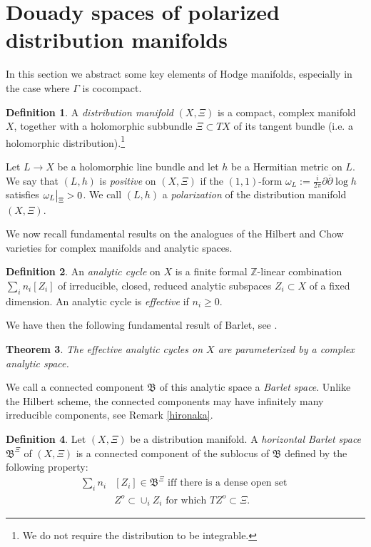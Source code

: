 \documentclass[10pt,letterpaper,english,reqno]{amsart}
\numberwithin{equation}{subsection}
\newcommand\Z{{\mathbb Z}}
\newtheorem{theorem}{Theorem}[section]
\theoremstyle{definition}
\newtheorem{definition}[theorem]{Definition}
\begin{document}
\section{Douady spaces of polarized distribution manifolds}

In this section we abstract some key elements of Hodge
manifolds, especially in the case where $\Gamma$ is cocompact.

\begin{definition} A {\it distribution manifold} $(X,\Xi)$ is a compact,
complex manifold $X$, together with a holomorphic subbundle
$\Xi\subset TX$ of its tangent bundle (i.e. a holomorphic 
distribution).\footnote{We do not require the distribution to be integrable.}

Let $L\to X$ be a holomorphic line bundle and let $h$ be a Hermitian 
metric on $L$. We say that $(L,h)$ is {\it positive} on $(X,\Xi)$ if 
the $(1,1)$-form 
$\omega_L:=\frac{i}{2\pi}\partial\overline{\partial}\log h$ 
satisfies $\omega_L\big{|}_{\Xi}>0$. We call $(L,h)$ a {\it polarization}
of the distribution manifold $(X,\Xi)$. \end{definition}

We now recall fundamental results on the analogues of
the Hilbert and Chow varieties for complex manifolds and 
analytic spaces.

\begin{definition} An {\it analytic cycle} on $X$ is a finite
formal $\Z$-linear combination $\sum_i n_i[Z_i]$ of 
irreducible, closed, reduced analytic subspaces
$Z_i\subset X$ of a fixed dimension. 
An analytic cycle is {\it effective} if $n_i\geq 0$. \end{definition}

We have then the following fundamental result of Barlet, 
see \cite{barlet}.

\begin{theorem}\label{barlet} The effective analytic 
cycles on $X$ are parameterized by a complex
analytic space.
\end{theorem}

We call a connected component $\mathfrak{B}$ 
of this analytic space a {\it Barlet space}.
Unlike the Hilbert
scheme, the connected components
may have infinitely many irreducible
components, see Remark
\ref{hironaka}.

\begin{definition} Let $(X,\Xi)$ be a distribution manifold. A {\it horizontal Barlet space} $\mathfrak{B}^{\Xi}$ of $(X,\Xi)$ is a connected component
of the sublocus of $\mathfrak{B}$ defined by the following property: \begin{align*} \textstyle \sum_i n_i&[Z_i]\in
\mathfrak{B}^{\Xi}\textrm{ iff there is a dense open set }  \\ & Z^o\subset \cup_iZ_i\textrm{ for which }TZ^o\subset \Xi. \end{align*} \end{definition}
\end{document}
